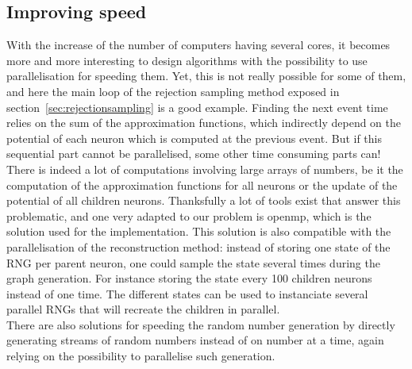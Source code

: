 \subsection{Improving speed}
	With the increase of the number of computers having several cores, it becomes more and more interesting to design algorithms with the possibility to use parallelisation for speeding them. Yet, this is not really possible for some of them, and here the main loop of the rejection sampling method exposed in section~\ref{sec:rejectionsampling} is a good example. Finding the next event time relies on the sum of the approximation functions, which indirectly depend on the potential of each neuron which is computed at the previous event. But if this sequential part cannot be parallelised, some other time consuming parts can!\\\indent
	There is indeed a lot of computations involving large arrays of numbers, be it the computation of the approximation functions for all neurons or the update of the potential of all children neurons. Thanksfully a lot of tools exist that answer this problematic, and one very adapted to our problem is openmp, which is the solution used for the implementation. This solution is also compatible with the parallelisation of the reconstruction method: instead of storing one state of the RNG per parent neuron, one could sample the state several times during the graph generation. For instance storing the state every 100 children neurons instead of one time. The different states can be used to instanciate several parallel RNGs that will recreate the children in parallel.\\\indent 
	There are also solutions for speeding the random number generation by directly generating streams of random numbers instead of on number at a time, again relying on the possibility to parallelise such generation.\\
	
